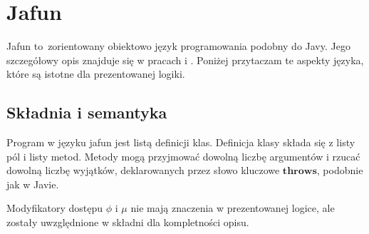 \documentclass[]{pracamgr}
\renewcommand \| {\hspace{0.75em} | \hspace{0.75em} }
\renewcommand \[ {[\![}
\renewcommand \] {]\!]}
\theoremstyle{definition}
\newcommand{\mmod}{\mu\xspace}
\newcommand{\fmodifier}{\phi\xspace}
\newcommand{\throws}{\mathbf{throws}\xspace}
\begin{document}
\chapter{Jafun}

Jafun to~zorientowany obiektowo język programowania podobny do Javy.
Jego szczegółowy opis znajduje się w pracach \cite{jafun-def} i \cite{jafun-sem}.
Poniżej przytaczam te aspekty języka, które są istotne dla prezentowanej logiki.

\section{Składnia i semantyka}

Program w języku jafun jest listą definicji klas.
Definicja klasy składa się z listy pól i listy metod.
Metody mogą przyjmować dowolną liczbę argumentów i rzucać dowolną liczbę wyjątków,
deklarowanych przez słowo kluczowe $\throws$, podobnie jak w Javie.

Modyfikatory dostępu $\fmodifier$ i $\mmod$ nie mają znaczenia w prezentowanej logice, ale zostały uwzględnione
w składni dla kompletności opisu.
\end{document}
